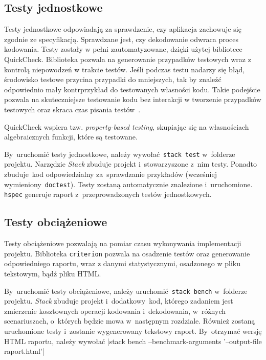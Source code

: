 \documentclass[../../praca.tex]{subfiles}
\begin{document}
\subsection{Testy jednostkowe}

Testy jednostkowe odpowiadają za sprawdzenie, czy aplikacja zachowuje
się zgodnie ze specyfikacją. Sprawdzane jest, czy dekodowanie odwraca
proces kodowania. Testy zostały w pełni zautomatyzowane, dzięki
użytej bibliotece QuickCheck. Biblioteka pozwala na generowanie przypadków
testowych wraz z kontrolą niepowodzeń w trakcie testów. Jeśli podczas testu
nadarzy się błąd, środowisko testowe przycina przypadki do mniejszych, tak by
znaleźć odpowiednio mały kontrprzykład do testowanych własności kodu. 
Takie podejście pozwala na skuteczniejsze testowanie kodu bez interakcji w tworzenie
przypadków testowych oraz skraca czas pisania testów~\cite{Claessen:QLT}.

QuickCheck wspiera tzw. \emph{property-based testing}, skupiając się 
na własnościach algebraicznych funkcji, które są testowane.

By~uruchomić testy jednostkowe, należy wywołać~\texttt{stack test}
w~folderze projektu. Narzędzie \emph{Stack} zbuduje projekt
i~stowarzyszone z~nim testy. Ponadto zbuduje~kod
odpowiedzialny za~sprawdzanie przykładów (wcześniej
wymieniony~\texttt{doctest}). Testy zostaną automatycznie
znalezione i~uruchomione. \texttt{hspec} 
generuje raport z~przeprowadzonych testów jednostkowych.

\subsection{Testy obciążeniowe}

Testy obciążeniowe pozwalają na pomiar czasu wykonywania implementacji projektu.
Biblioteka \texttt{criterion} pozwala na osadzenie testów oraz generowanie
odpowiedniego raportu, wraz z danymi statystycznymi, osadzonego w pliku tekstowym,
bądź pliku HTML.

By~uruchomić testy obciążeniowe, należy uruchomić~\texttt{stack bench}
w~folderze projektu. \emph{Stack} zbuduje projekt
i~dodatkowy~kod, którego zadaniem jest zmierzenie
kosztownych operacji kodowania i~dekodowania,
w~różnych scenariuszach, o~których będzie mowa
w~następnym rozdziale. Również zostaną uruchomione
testy i~zostanie wygenerowany tekstowy raport. 
By~otrzymać wersję HTML raportu, należy wywołać
|stack bench --benchmark-arguments '--output-file raport.html'|
\end{document}
